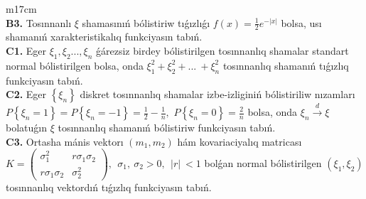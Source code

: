 \documentclass{article}
\begin{document}
\begin{tabular}{m{17cm}}
 \\
\textbf{B3.} Tosınnanlı \(\xi\) shamasınıń bólistiriw tıǵızlıǵı \(f(x) = \frac{1}{2}e^{- |x|}\) bolsa, usı shamanıń xarakteristikalıq funkciyasın tabıń.
 \\
\textbf{C1.} Eger \(\xi_{1},\xi_{2}...,\xi_{n}\) ǵárezsiz birdey bólistirilgen tosınnanlıq shamalar standart normal bólistirilgen bolsa, onda \(\xi_{1}^{2} + \xi_{2}^{2} + ...\  + \xi_{n}^{2}\) tosınnanlıq shamanıń tıǵızlıq funkciyasın tabıń.
 \\
\textbf{C2.} Eger \(\left\{ \xi_{n} \right\}\) diskret tosınnanlıq shamalar izbe-izliginiń bólistiriliw nızamları\(P\left\{ \xi_{n} = 1 \right\} = P\left\{ \xi_{n} = - 1 \right\} = \frac{1}{2} - \frac{1}{n},\) \(P\left\{ \xi_{n} = 0 \right\} = \frac{2}{n}\) bolsa, onda \(\xi_{n}\overset{d}{\rightarrow}\xi\) bolatuǵın \(\xi\) tosınnanlıq shamanıń bólistiriw funkciyasın tabıń.
 \\
\textbf{C3.} Ortasha mánis vektorı \(\left( m_{1},m_{2} \right)\) hám kovariaciyalıq matricası\(K = \begin{pmatrix}
\sigma_{1}^{2} & r\sigma_{1}\sigma_{2} \\
r\sigma_{1}\sigma_{2} & \sigma_{2}^{2}
\end{pmatrix},\ \ \sigma_{1},\ \sigma_{2} > 0,\ \ |r|\  < 1\) bolǵan normal bólistirilgen \(\left( \xi_{1},\xi_{2} \right)\) tosınnanlıq vektordıń tıǵızlıq funkciyasın tabıń.
 \\

\end{tabular}
\vspace{1cm}
\end{document}
